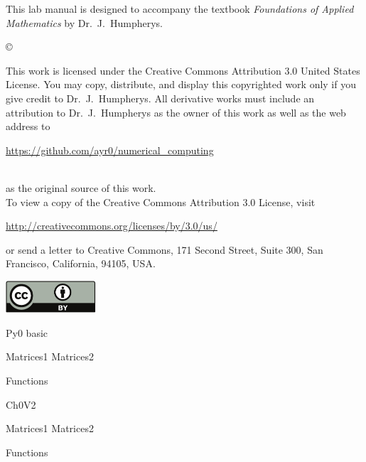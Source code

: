 \documentclass{newsiambook}
\begin{document}
\begin{thepreface}
This lab manual is designed to accompany the textbook \emph{Foundations of Applied Mathematics} by Dr.~J.~Humpherys.

\vfill
\copyright{This work is licensed under the Creative Commons Attribution 3.0 United States 
License.  You may copy, distribute, and display this copyrighted work only if you give 
credit to Dr.~J.~Humpherys. All derivative works must include an attribution to Dr.~J.~Humpherys as the owner of this work as well as the web address to 
\\\centerline{\url{https://github.com/ayr0/numerical_computing}}\\ as the original source of 
this 
work.\\To view a copy of the Creative Commons Attribution 3.0 License, 
visit\\\centerline{\url{http://creativecommons.org/licenses/by/3.0/us/}} or send a letter to 
Creative Commons, 171 Second Street, Suite 300, San Francisco, California, 94105, USA.}

\vfill
\centering\includegraphics[height=1.2cm]{by}
\vfill
\end{thepreface}

\setcounter{tocdepth}{1}
\tableofcontents

\mainmatter


\begin{python}
{Py0}
{basic}

{Matrices1}
{Matrices2}

{Functions}
\end{python}

\begin{matlab}
{Ch0V2}

{Matrices1}
{Matrices2}

{Functions}
\end{matlab}
\end{document}
